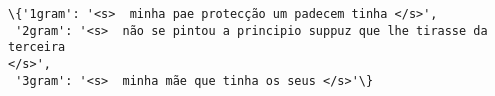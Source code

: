 \documentclass[11pt]{article}
\makeatletter
\newcommand{\boxspacing}{\kern\kvtcb@left@rule\kern\kvtcb@boxsep}
\newcommand{\prompt}[4]{
        {\ttfamily\llap{{\color{#2}[#3]:\hspace{3pt}#4}}\vspace{-\baselineskip}}
    }
\makeatother
\begin{document}
            \begin{tcolorbox}[breakable, size=fbox, boxrule=.5pt, pad at break*=1mm, opacityfill=0]
\prompt{Out}{outcolor}{262}{\boxspacing}
\begin{Verbatim}[commandchars=\\\{\}]
\{'1gram': '<s>  minha pae protecção um padecem tinha </s>',
 '2gram': '<s>  não se pintou a principio suppuz que lhe tirasse da terceira
</s>',
 '3gram': '<s>  minha mãe que tinha os seus </s>'\}
\end{Verbatim}
\end{tcolorbox}
        
    \begin{tcolorbox}[breakable, size=fbox, boxrule=1pt, pad at break*=1mm,colback=cellbackground, colframe=cellborder]
\prompt{In}{incolor}{ }{\boxspacing}
\begin{Verbatim}[commandchars=\\\{\}]

\end{Verbatim}
\end{tcolorbox}


    
    
    
\end{document}
